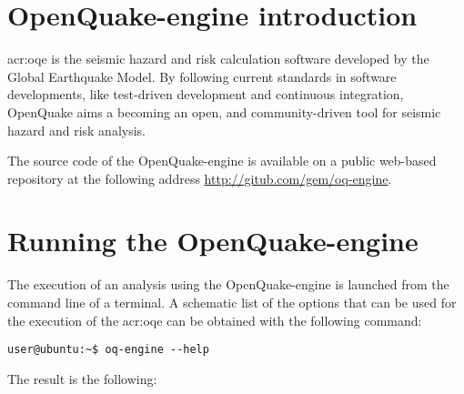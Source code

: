 \section{OpenQuake-engine introduction}
\gls{acr:oqe} is the seismic hazard and risk calculation software developed by
the Global Earthquake Model. By following current standards in software developments, like test-driven development and continuous
integration, OpenQuake aims a becoming an open, and community-driven tool for
seismic hazard and risk analysis.

The source code of the OpenQuake-engine is available on a public web-based repository
at the following address \href{http://gitub.com/gem/oq-engine}{http://gitub.com/gem/oq-engine}.
\section{Running the OpenQuake-engine}
\label{sec:intro}
The execution of an analysis using the OpenQuake-engine is launched from 
the command line of a terminal. A schematic list of the options that 
can be used for the execution of the \gls{acr:oqe} can be obtained 
with the following command:
\begin{Verbatim}[frame=single, commandchars=\\\{\}, fontsize=\small]
user@ubuntu:~$ oq-engine --help
\end{Verbatim}
The result is the following:


